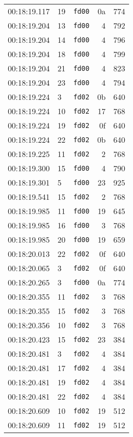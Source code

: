 \documentclass{article}
\begin{document}
\begin{longtable}{lllrr}
00:18:19.117 & 19 & \texttt{fd00} & 0a & 774 \\
00:18:19.204 & 13 & \texttt{fd00} & 4 & 792 \\
00:18:19.204 & 14 & \texttt{fd00} & 4 & 796 \\
00:18:19.204 & 18 & \texttt{fd00} & 4 & 799 \\
00:18:19.204 & 21 & \texttt{fd00} & 4 & 823 \\
00:18:19.204 & 23 & \texttt{fd00} & 4 & 794 \\
00:18:19.224 & 3 & \texttt{fd02} & 0b & 640 \\
00:18:19.224 & 10 & \texttt{fd02} & 17 & 768 \\
00:18:19.224 & 19 & \texttt{fd02} & 0f & 640 \\
00:18:19.224 & 22 & \texttt{fd02} & 0b & 640 \\
00:18:19.225 & 11 & \texttt{fd02} & 2 & 768 \\
00:18:19.300 & 15 & \texttt{fd00} & 4 & 790 \\
00:18:19.301 & 5 & \texttt{fd00} & 23 & 925 \\
00:18:19.541 & 15 & \texttt{fd02} & 2 & 768 \\
00:18:19.985 & 11 & \texttt{fd00} & 19 & 645 \\
00:18:19.985 & 16 & \texttt{fd00} & 3 & 768 \\
00:18:19.985 & 20 & \texttt{fd00} & 19 & 659 \\
00:18:20.013 & 22 & \texttt{fd02} & 0f & 640 \\
00:18:20.065 & 3 & \texttt{fd02} & 0f & 640 \\
00:18:20.265 & 3 & \texttt{fd00} & 0a & 774 \\
00:18:20.355 & 11 & \texttt{fd02} & 3 & 768 \\
00:18:20.355 & 15 & \texttt{fd02} & 3 & 768 \\
00:18:20.356 & 10 & \texttt{fd02} & 3 & 768 \\
00:18:20.423 & 15 & \texttt{fd02} & 23 & 384 \\
00:18:20.481 & 3 & \texttt{fd02} & 4 & 384 \\
00:18:20.481 & 17 & \texttt{fd02} & 4 & 384 \\
00:18:20.481 & 19 & \texttt{fd02} & 4 & 384 \\
00:18:20.481 & 22 & \texttt{fd02} & 4 & 384 \\
00:18:20.609 & 10 & \texttt{fd02} & 19 & 512 \\
00:18:20.609 & 11 & \texttt{fd02} & 19 & 512 \\

\end{longtable}
\end{document}
